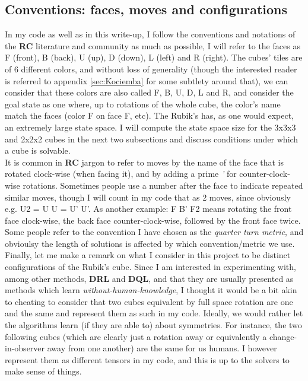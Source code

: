 \subsection{Conventions: faces, moves and configurations}
In my code as well as in this write-up, I follow the conventions and notations of the \textbf{RC} literature and community as much as possible, I will refer to the faces as F (front), B (back), U (up), D (down), L (left) and R (right). The cubes' tiles are of 6 different colors, and without loss of generality (though the interested reader is referred to appendix \ref{sec:Kociemba} for some subtlety around that), we can consider that these colors are also called F, B, U, D, L and R, and consider the goal state as one where, up to rotations of the whole cube, the color's name match the faces (color F on face F, etc). The Rubik's has, as one would expect, an extremely large state space. I will compute the state space size for the 3x3x3 and 2x2x2 cubes in the next two subsections and discuss conditions under which  a cube is solvable.
\\
It is common in \textbf{RC} jargon to refer to moves  by the name of the face that is rotated clock-wise (when facing it), and by adding a prime \textit{'} for counter-clock-wise rotations. Sometimes people use a number after the face to indicate repeated similar moves, though I will count in my code that as 2 moves, since obviously e.g. U2 = U U = U' U'. As another example: F B' F2 means rotating the front face clock-wise, the back face counter-clock-wise, followed by the front face twice. Some people refer to the convention I have chosen as the \textit{quarter turn metric}, and obvioulsy the length of solutions is affected by which convention/metric we use.
\\
Finally, let me make a remark on what I consider in this project to be distinct configurations of the Rubik's cube. Since I am interested in experimenting with, among other methods, \textbf{DRL} and \textbf{DQL}, and that they are usually presented as methods which learn \textit{without-human-knowledge}, I thought it would be a bit akin to cheating to consider that two cubes equivalent by full space rotation are one and the same and represent them as such in my code. Ideally, we would rather let the algorithms learn (if they are able to) about symmetries. For instance, the two following cubes (which are clearly just a rotation away or equivalently a change-in-observer away from one another) are the same for us humans. I however represent them as different tensors in my code, and this is up to the solvers to make sense of things.

